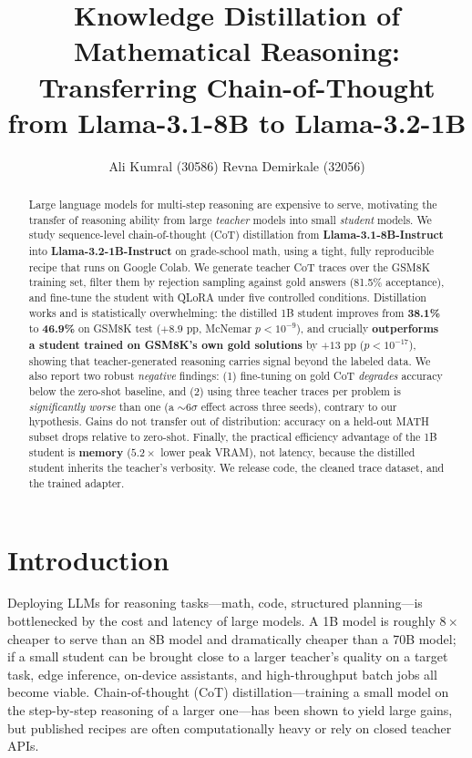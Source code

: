 \documentclass[11pt]{article}
\title{\textbf{Knowledge Distillation of Mathematical Reasoning:\\
Transferring Chain-of-Thought from Llama-3.1-8B to Llama-3.2-1B}}
\author[]{Ali Kumral (30586) \quad Revna Demirkale (32056)}
\affil[]{CS 455 --- Large Language Models, Spring 2025/2026 \quad Category (D): Efficiency / Optimization}
\date{}
\begin{document}
\maketitle

\begin{abstract}
\noindent
Large language models for multi-step reasoning are expensive to serve, motivating
the transfer of reasoning ability from large \emph{teacher} models into small
\emph{student} models. We study sequence-level chain-of-thought (CoT) distillation
from \textbf{Llama-3.1-8B-Instruct} into \textbf{Llama-3.2-1B-Instruct} on
grade-school math, using a tight, fully reproducible recipe that runs on Google
Colab. We generate teacher CoT traces over the GSM8K training set, filter them by
rejection sampling against gold answers (81.5\% acceptance), and fine-tune the
student with QLoRA under five controlled conditions. Distillation works and is
statistically overwhelming: the distilled 1B student improves from \textbf{38.1\%}
to \textbf{46.9\%} on GSM8K test ($+8.9$ pp, McNemar $p<10^{-9}$), and crucially
\textbf{outperforms a student trained on GSM8K's own gold solutions} by $+13$ pp
($p<10^{-17}$), showing that teacher-generated reasoning carries signal beyond the
labeled data. We also report two robust \emph{negative} findings: (1) fine-tuning
on gold CoT \emph{degrades} accuracy below the zero-shot baseline, and (2) using
three teacher traces per problem is \emph{significantly worse} than one (a
$\sim$6$\sigma$ effect across three seeds), contrary to our hypothesis. Gains do
not transfer out of distribution: accuracy on a held-out MATH subset drops relative
to zero-shot. Finally, the practical efficiency advantage of the 1B student is
\textbf{memory} ($5.2\times$ lower peak VRAM), not latency, because the distilled
student inherits the teacher's verbosity. We release code, the cleaned trace
dataset, and the trained adapter.
\end{abstract}

\section{Introduction}
Deploying LLMs for reasoning tasks---math, code, structured planning---is
bottlenecked by the cost and latency of large models. A 1B model is roughly
$8\times$ cheaper to serve than an 8B model and dramatically cheaper than a 70B
model; if a small student can be brought close to a larger teacher's quality on a
target task, edge inference, on-device assistants, and high-throughput batch jobs
all become viable. Chain-of-thought (CoT) distillation---training a small model on
the step-by-step reasoning of a larger one---has been shown to yield large gains,
but published recipes are often computationally heavy or rely on closed teacher
APIs.
\end{document}

